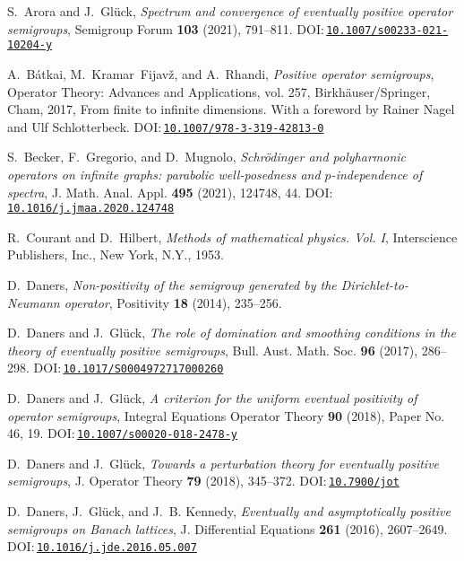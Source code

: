 \documentclass[a4paper, reqno,titlepage]{amsart}
\numberwithin{equation}{section}
\theoremstyle{plain}
\theoremstyle{definition}
\theoremstyle{remark}
\begin{document}
\begin{thebibliography}{10}
S.~Arora and J.~Gl\"{u}ck, \emph{Spectrum and convergence of eventually
  positive operator semigroups}, Semigroup Forum \textbf{103} (2021), 791--811.
  DOI:\,\href{https://doi.org/10.1007/s00233-021-10204-y}{\nolinkurl{10.1007/s00233-021-10204-y}}

A.~B\'{a}tkai, M.~Kramar~Fijav\v{z}, and A.~Rhandi, \emph{Positive operator
  semigroups}, Operator Theory: Advances and Applications, vol. 257,
  Birkh\"{a}user/Springer, Cham, 2017, From finite to infinite dimensions. With
  a foreword by Rainer Nagel and Ulf Schlotterbeck.
  DOI:\,\href{https://doi.org/10.1007/978-3-319-42813-0}{\nolinkurl{10.1007/978-3-319-42813-0}}

S.~Becker, F.~Gregorio, and D.~Mugnolo, \emph{Schr\"{o}dinger and polyharmonic
  operators on infinite graphs: parabolic well-posedness and {$p$}-independence
  of spectra}, J. Math. Anal. Appl. \textbf{495} (2021), 124748, 44.
  DOI:\,\href{https://doi.org/10.1016/j.jmaa.2020.124748}{\nolinkurl{10.1016/j.jmaa.2020.124748}}

R.~Courant and D.~Hilbert, \emph{Methods of mathematical physics. {V}ol. {I}},
  Interscience Publishers, Inc., New York, N.Y., 1953.

D.~Daners, \emph{Non-positivity of the semigroup generated by the
  {D}irichlet-to-{N}eumann operator}, Positivity \textbf{18} (2014), 235--256.

D.~Daners and J.~Gl\"{u}ck, \emph{The role of domination and smoothing
  conditions in the theory of eventually positive semigroups}, Bull. Aust.
  Math. Soc. \textbf{96} (2017), 286--298.
  DOI:\,\href{https://doi.org/10.1017/S0004972717000260}{\nolinkurl{10.1017/S0004972717000260}}

D.~Daners and J.~Gl\"{u}ck, \emph{A criterion for the uniform eventual
  positivity of operator semigroups}, Integral Equations Operator Theory
  \textbf{90} (2018), Paper No. 46, 19.
  DOI:\,\href{https://doi.org/10.1007/s00020-018-2478-y}{\nolinkurl{10.1007/s00020-018-2478-y}}

D.~Daners and J.~Gl\"{u}ck, \emph{Towards a perturbation theory for eventually
  positive semigroups}, J. Operator Theory \textbf{79} (2018), 345--372.
  DOI:\,\href{https://doi.org/10.7900/jot}{\nolinkurl{10.7900/jot}}

D.~Daners, J.~Gl\"{u}ck, and J.~B. Kennedy, \emph{Eventually and asymptotically
  positive semigroups on {B}anach lattices}, J. Differential Equations
  \textbf{261} (2016), 2607--2649.
  DOI:\,\href{https://doi.org/10.1016/j.jde.2016.05.007}{\nolinkurl{10.1016/j.jde.2016.05.007}}


\end{thebibliography}
\end{document}
